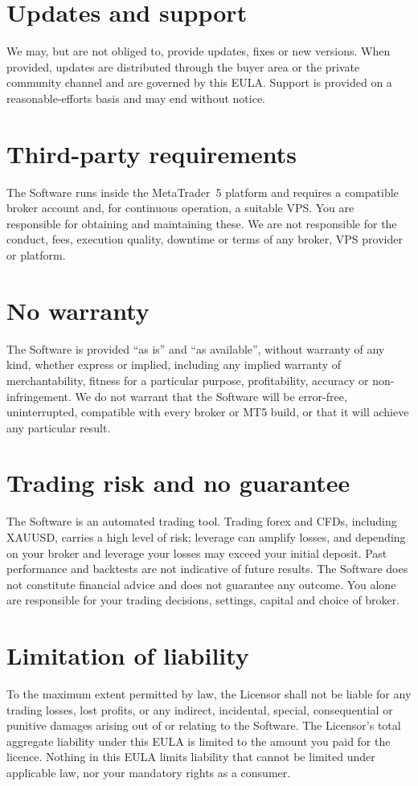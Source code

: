 \documentclass[11pt,a4paper]{article}
\begin{document}
\section{Updates and support}
We may, but are not obliged to, provide updates, fixes or new versions. When provided, updates are
distributed through the buyer area or the private community channel and are governed by this EULA.
Support is provided on a reasonable-efforts basis and may end without notice.

\section{Third-party requirements}
The Software runs inside the MetaTrader~5 platform and requires a compatible broker account and,
for continuous operation, a suitable VPS. You are responsible for obtaining and maintaining these.
We are not responsible for the conduct, fees, execution quality, downtime or terms of any broker,
VPS provider or platform.

\section{No warranty}
The Software is provided ``as is'' and ``as available'', without warranty of any kind, whether
express or implied, including any implied warranty of merchantability, fitness for a particular
purpose, profitability, accuracy or non-infringement. We do not warrant that the Software will be
error-free, uninterrupted, compatible with every broker or MT5 build, or that it will achieve any
particular result.

\section{Trading risk and no guarantee}
The Software is an automated trading tool. Trading forex and CFDs, including XAUUSD, carries a high
level of risk; leverage can amplify losses, and depending on your broker and leverage your losses
may exceed your initial deposit. Past performance and backtests are not indicative of future
results. The Software does not constitute financial advice and does not guarantee any outcome. You
alone are responsible for your trading decisions, settings, capital and choice of broker.

\section{Limitation of liability}
To the maximum extent permitted by law, the Licensor shall not be liable for any trading losses,
lost profits, or any indirect, incidental, special, consequential or punitive damages arising out of
or relating to the Software. The Licensor's total aggregate liability under this EULA is limited to
the amount you paid for the licence. Nothing in this EULA limits liability that cannot be limited
under applicable law, nor your mandatory rights as a consumer.
\end{document}
